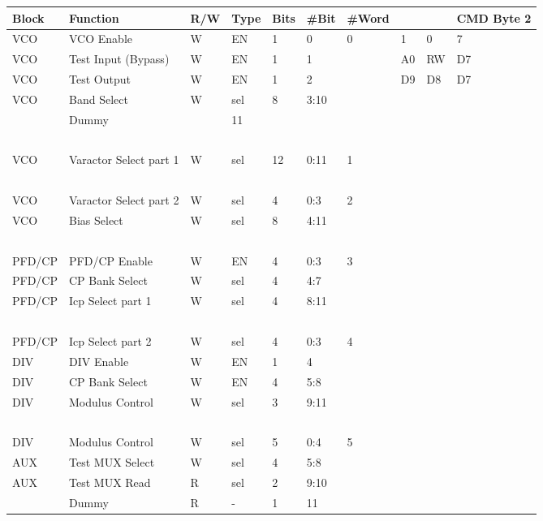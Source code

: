 \begin{table}[!ht]
    \centering
    \begin{tabular}{|l|l|l|l|l|l|l|l|l|l|}
    \hline
    \rowcolor{LightCyan}
        Block & Function & R/W & Type & Bits & \#Bit & \#Word  & ~ & ~ & CMD Byte 2 \\ \hline
        VCO & VCO Enable & W & EN & 1 & 0 & 0 & 1 & 0 & 7 \\ \hline
        VCO & Test Input (Bypass) & W & EN & 1 & 1 & ~ & A0 & RW & D7 \\ \hline
        VCO & Test Output & W & EN & 1 & 2 & ~ & D9 & D8 & D7 \\ \hline
        VCO & Band Select & W & sel & 8 & 3:10 & ~ & ~ & ~ & ~ \\ \hline
        ~ & Dummy & ~ & 11 & ~ & ~ & ~ & ~ & ~ & ~ \\ \hline
        ~ & ~ & ~ & ~ & ~ & ~ & ~ & ~ & ~ & ~ \\ \hline
        VCO & Varactor Select part 1 & W & sel & 12 & 0:11 & 1 & ~ & ~ & ~ \\ \hline
        ~ & ~ & ~ & ~ & ~ & ~ & ~ & ~ & ~ & ~ \\ \hline
        VCO & Varactor Select part 2 & W & sel & 4 & 0:3 & 2 & ~ & ~ & ~ \\ \hline
        VCO & Bias Select & W & sel & 8 & 4:11 & ~ & ~ & ~ & ~ \\ \hline
        ~ & ~ & ~ & ~ & ~ & ~ & ~ & ~ & ~ & ~ \\ \hline
        PFD/CP & PFD/CP Enable & W & EN & 4 & 0:3 & 3 & ~ & ~ & ~ \\ \hline
        PFD/CP & CP Bank Select & W & sel & 4 & 4:7 & ~ & ~ & ~ & ~ \\ \hline
        PFD/CP & Icp Select part 1 & W & sel & 4 & 8:11 & ~ & ~ & ~ & ~ \\ \hline
        ~ & ~ & ~ & ~ & ~ & ~ & ~ & ~ & ~ & ~ \\ \hline
        PFD/CP & Icp Select part 2 & W & sel & 4 & 0:3 & 4 & ~ & ~ & ~ \\ \hline
        DIV & DIV Enable & W & EN & 1 & 4 & ~ & ~ & ~ & ~ \\ \hline
        DIV & CP Bank Select & W & EN & 4 & 5:8 & ~ & ~ & ~ & ~ \\ \hline
        DIV & Modulus Control & W & sel & 3 & 9:11 & ~ & ~ & ~ & ~ \\ \hline
        ~ & ~ & ~ & ~ & ~ & ~ & ~ & ~ & ~ & ~ \\ \hline
        DIV & Modulus Control & W & sel & 5 & 0:4 & 5 & ~ & ~ & ~ \\ \hline
        AUX & Test MUX Select & W & sel & 4 & 5:8 & ~ & ~ & ~ & ~ \\ \hline
        AUX & Test MUX Read & R & sel & 2 & 9:10 & ~ & ~ & ~ & ~ \\ \hline
        ~ & Dummy & R & - & 1 & 11 & ~ & ~ & ~ & ~ \\ \hline
    \end{tabular}
\end{table}

